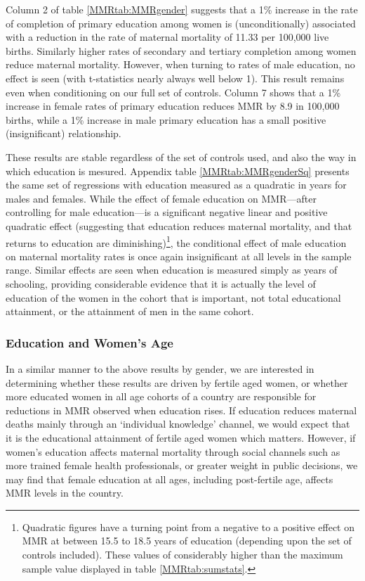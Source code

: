 \documentclass{article}[12pt,subeqn]
\begin{document}
\begin{spacing}{1.4}
Column 2 of table \ref{MMRtab:MMRgender} suggests that a 1\% increase in the
rate of completion of primary education among women is (unconditionally) 
associated with a reduction in the rate of maternal mortality of 11.33 per 
100,000 live births.  Similarly higher rates of secondary and tertiary 
completion among women reduce maternal mortality.  However, when turning to 
rates of male education, no effect is seen (with t-statistics nearly always
well below 1).  This result remains even when conditioning on our full set
of controls.  Column 7 shows that a 1\% increase in female rates of primary
education reduces MMR by 8.9 in 100,000 births, while a 1\% increase in male
primary education has a small positive (insignificant) relationship.

These results are stable regardless of the set of controls used, and also the
way in which education is mesured.  Appendix table \ref{MMRtab:MMRgenderSq} 
presents the same set of regressions with education measured as a quadratic
in years for males and females.  While the effect of female education on 
MMR---after controlling for male education---is a significant negative linear 
and positive quadratic effect (suggesting that education reduces maternal 
mortality, and that returns to education are diminishing)\footnote{Quadratic 
figures have a turning point from a negative to a positive effect on MMR at 
between 15.5 to 18.5 years of education (depending upon the set of controls 
included).  These values of considerably higher than the maximum sample value 
displayed in table \ref{MMRtab:sumstats}.}, the conditional effect of male 
education on maternal mortality rates is once again insignificant at all
levels in the sample range.  Similar effects are seen when education is
measured simply as years of schooling, providing considerable evidence that
it is actually the level of education of the women in the cohort that is 
important, not total educational attainment, or the attainment of men in the 
same cohort.

\subsubsection{Education and Women's Age}
\label{ssscn:age}
In a similar manner to the above results by gender, we are interested in
determining whether these results are driven by fertile aged women, or whether
more educated women in all age cohorts of a country are responsible for
reductions in MMR observed when education rises.  If education reduces maternal
deaths mainly through an `individual knowledge' channel, we would expect that
it is the educational attainment of fertile aged women which matters.  However,
if women's education affects maternal mortality through social channels such as
more trained female health professionals, or greater weight in public decisions,
we may find that female education at all ages, including post-fertile age, affects
MMR levels in the country.


\end{spacing}
\end{document}
